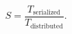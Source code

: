 \begin{equation}
  S = \frac{T_{\mathrm{serialized}}}{T_{\mathrm{distributed}}}.
  \label{eq:speedup}
\end{equation}